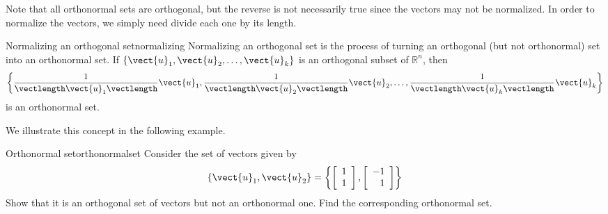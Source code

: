 Note that all orthonormal sets are orthogonal, but the reverse is not
necessarily true since the vectors may not be normalized. In order to
normalize the vectors, we simply need divide each one by its length.

\begin{definition}{Normalizing an orthogonal set}{normalizing}
Normalizing an orthogonal set is the process of 
turning an orthogonal (but not orthonormal) set into
an orthonormal set.
If $\{ \vect{u}_1, \vect{u}_2, \ldots, \vect{u}_k\}$
is an orthogonal subset of $\mathbb{R}^n$, 
then 
\[ \left\{
\frac{1}{\vectlength\vect{u}_1\vectlength}\vect{u}_1,
\frac{1}{\vectlength\vect{u}_2\vectlength}\vect{u}_2, \ldots,
\frac{1}{\vectlength\vect{u}_k\vectlength}\vect{u}_k \right\}
\]
is an orthonormal set.
\end{definition}

We illustrate this concept in the following example. 

\begin{example}{Orthonormal set}{orthonormalset}
Consider the set of vectors  given by 
\[
\left\{ \vect{u}_1, \vect{u}_2 \right\} = \left\{
\left[
\begin{array}{c}
1 \\
1 
\end{array}
\right], 
\left[
\begin{array}{r}
-1 \\
1
\end{array}
\right]
\right\}
\]
Show that it is an orthogonal set of vectors  but not an orthonormal one. Find the corresponding orthonormal set. 
\end{example}

